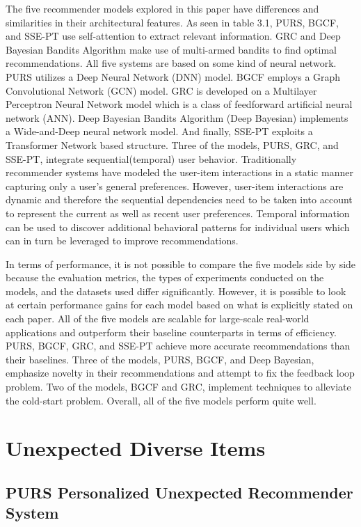 The five recommender models explored in this paper have differences and similarities in their architectural features. As seen in table 3.1, PURS, BGCF, and SSE-PT use self-attention to extract relevant information. GRC and Deep Bayesian Bandits Algorithm make use of multi-armed bandits to find optimal recommendations. All five systems are based on some kind of neural network. PURS utilizes a Deep Neural Network (DNN) model. BGCF employs a Graph Convolutional Network (GCN) model. GRC is developed on a Multilayer Perceptron Neural Network model which is a class of feedforward artificial neural network (ANN). Deep Bayesian Bandits Algorithm (Deep Bayesian) implements a Wide-and-Deep neural network model. And finally, SSE-PT exploits a Transformer Network based structure. Three of the models, PURS, GRC, and SSE-PT, integrate sequential(temporal) user behavior. Traditionally recommender systems have modeled the user-item interactions in a static manner capturing only a user's general preferences. However, user-item interactions are dynamic and therefore the sequential dependencies need to be taken into account to represent the current as well as recent user preferences. Temporal information can be used to discover additional behavioral patterns for individual users which can in turn be leveraged to improve recommendations.

In terms of performance, it is not possible to compare the five models side by side because the evaluation metrics, the types of experiments conducted on the models, and the datasets used differ significantly. However, it is possible to look at certain performance gains for each model based on what is explicitly stated on each paper. All of the five models are scalable for large-scale real-world applications and outperform their baseline counterparts in terms of efficiency. PURS, BGCF, GRC, and SSE-PT achieve more accurate recommendations than their baselines. Three of the models, PURS, BGCF, and Deep Bayesian, emphasize novelty in their recommendations and attempt to fix the feedback loop problem. Two of the models, BGCF and GRC, implement techniques to alleviate the cold-start problem.  Overall, all of the five models perform quite well. 

\chapter{Unexpected Diverse Items}
\section{PURS Personalized Unexpected Recommender System}

